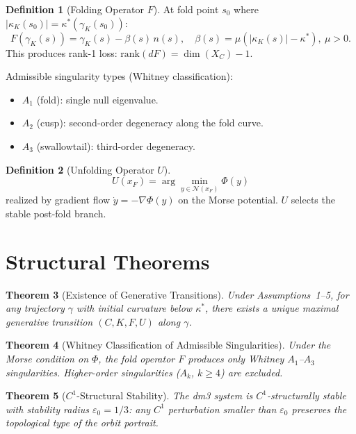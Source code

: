 \documentclass[11pt, twoside, openright]{book}
\theoremstyle{plain}
\newtheorem{theorem}{Theorem}[chapter]
\theoremstyle{definition}
\newtheorem{definition}[theorem]{Definition}
\newcommand{\eps}{\varepsilon_0}
\begin{document}
\begin{definition}[Folding Operator $F$]
At fold point $s_0$ where $|\kappa_K(s_0)| = \kappa^*(\gamma_K(s_0))$:
\[
F(\gamma_K(s)) = \gamma_K(s) - \beta(s)\,n(s), \quad
\beta(s) = \mu(|\kappa_K(s)| - \kappa^*),\ \mu > 0.
\]
This produces rank-1 loss: $\mathrm{rank}(dF) = \dim(X_C) - 1$.

Admissible singularity types (Whitney classification):
\begin{itemize}[leftmargin=*]
  \item $A_1$ (fold): single null eigenvalue.
  \item $A_2$ (cusp): second-order degeneracy along the fold curve.
  \item $A_3$ (swallowtail): third-order degeneracy.
\end{itemize}
\end{definition}

\begin{definition}[Unfolding Operator $U$]
\[
U(x_F) = \arg\min_{y \in \mathcal{N}(x_F)} \Phi(y)
\]
realized by gradient flow $\dot y = -\nabla\Phi(y)$ on the Morse
potential. $U$ selects the stable post-fold branch.
\end{definition}

\section{Structural Theorems}

\begin{theorem}[Existence of Generative Transitions]
Under Assumptions~1--5, for any trajectory $\gamma$ with initial
curvature below $\kappa^*$, there exists a unique maximal generative
transition $(C, K, F, U)$ along $\gamma$.
\end{theorem}

\begin{theorem}[Whitney Classification of Admissible Singularities]
Under the Morse condition on $\Phi$, the fold operator $F$ produces
only Whitney $A_1$--$A_3$ singularities. Higher-order singularities
($A_k$, $k \ge 4$) are excluded.
\end{theorem}

\begin{theorem}[$C^1$-Structural Stability]
The dm3 system is $C^1$-structurally stable with stability radius
$\eps = 1/3$: any $C^1$ perturbation smaller than $\eps$ preserves
the topological type of the orbit portrait.
\end{theorem}
\end{document}
